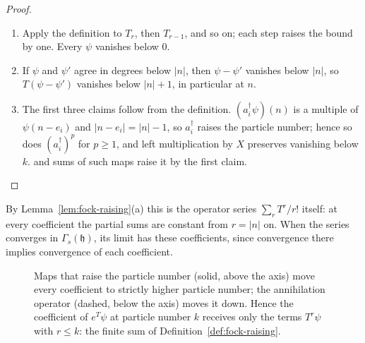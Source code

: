 \begin{proof}
\begin{enumerate}
\item[(a)] Apply the definition to $T_r$, then $T_{r-1}$, and so on; each step raises the
bound by one. Every $\psi$ vanishes below $0$.
\item[(b)] If $\psi$ and $\psi'$ agree in degrees below $\lvert n\rvert$, then $\psi-\psi'$
vanishes below $\lvert n\rvert$, so $T(\psi-\psi')$ vanishes below $\lvert n\rvert+1$, in
particular at $n$.
\item[(c)] The first three claims follow from the definition. $(a_i^\dagger\psi)(n)$ is a
multiple of $\psi(n-e_i)$ and $\lvert n-e_i\rvert=\lvert n\rvert-1$, so $a_i^\dagger$
raises the particle number; hence so does $(a_i^\dagger)^p$ for $p\ge1$, and left multiplication by $X$
preserves vanishing below $k$.  and sums of
such maps raise it by the first claim.\qedhere
\end{enumerate}
\end{proof}

 By Lemma~\ref{lem:fock-raising}(a) this is the operator series
$\sum_rT^r/r!$ itself: at every coefficient the partial sums are constant from
$r=\lvert n\rvert$ on. When the series converges in $\Gamma_s(\mathfrak h)$, its limit has
these coefficients, since convergence there implies convergence of each coefficient.

\begin{figure}[ht]
\centering\vetbcolor
{}
\caption{Maps that raise the particle number (solid, above the axis) move every coefficient to strictly higher particle
number; the annihilation operator (dashed, below the axis) moves it down. Hence the coefficient of $e^T\psi$ at particle
number $k$ receives only the terms $T^r\psi$ with $r\le k$: the finite sum of
Definition~\ref{def:fock-raising}.}\label{fig:fock-grading}
\end{figure}

